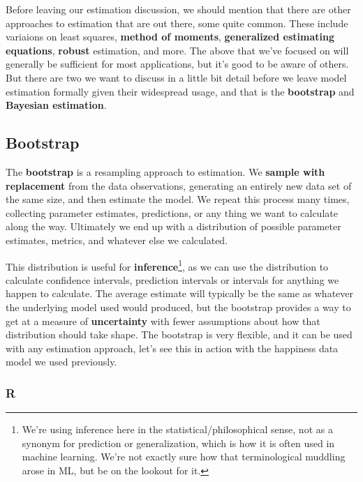 \documentclass[
  letterpaper,
]{krantz}
\begin{document}
Before leaving our estimation discussion, we should mention that there
are other approaches to estimation that are out there, some quite
common. These include variaions on least squares, \textbf{method of
moments}, \textbf{generalized estimating equations}, \textbf{robust}
estimation, and more. The above that we've focused on will generally be
sufficient for most applications, but it's good to be aware of others.
But there are two we want to discuss in a little bit detail before we
leave model estimation formally given their widespread usage, and that
is the \textbf{bootstrap} and \textbf{Bayesian estimation}.

\subsection{Bootstrap}\label{sec-estim-bootstrap}

The \textbf{bootstrap} is a resampling approach to estimation. We
\textbf{sample with replacement} from the data observations, generating
an entirely new data set of the same size, and then estimate the model.
We repeat this process many times, collecting parameter estimates,
predictions, or any thing we want to calculate along the way. Ultimately
we end up with a distribution of possible parameter estimates, metrics,
and whatever else we calculated.

This distribution is useful for \textbf{inference}\footnote{We're using
  inference here in the statistical/philosophical sense, not as a
  synonym for prediction or generalization, which is how it is often
  used in machine learning. We're not exactly sure how that
  terminological muddling arose in ML, but be on the lookout for it.},
as we can use the distribution to calculate confidence intervals,
prediction intervals or intervals for anything we happen to calculate.
The average estimate will typically be the same as whatever the
underlying model used would produced, but the bootstrap provides a way
to get at a measure of \textbf{uncertainty} with fewer assumptions about
how that distribution should take shape. The bootstrap is very flexible,
and it can be used with any estimation approach, let's see this in
action with the happiness data model we used previously.

\subsubsection{R}
\end{document}
